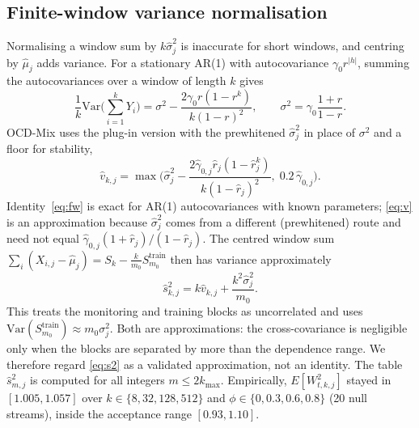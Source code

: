 \documentclass[conference]{IEEEtran}
\newcommand{\hs}{\hat{s}}
\begin{document}
\subsection{Finite-window variance normalisation}
Normalising a window sum by $k\hat\sigma_j^2$ is inaccurate for short windows, and centring by $\hat\mu_j$ adds variance. For a stationary AR(1) with autocovariance $\gamma_0r^{|h|}$, summing the autocovariances over a window of length $k$ gives
\begin{equation}
\frac1k\mathrm{Var}\Big(\sum_{i=1}^kY_i\Big)=\sigma^2-\frac{2\gamma_0r(1-r^k)}{k(1-r)^2},\qquad \sigma^2=\gamma_0\frac{1+r}{1-r}. \label{eq:fw}
\end{equation}
OCD-Mix uses the plug-in version with the prewhitened $\hat\sigma_j^2$ in place of $\sigma^2$ and a floor for stability,
\begin{equation}
\hat v_{k,j}=\max\Big(\hat\sigma_j^2-\frac{2\hat\gamma_{0,j}\hat r_j(1-\hat r_j^k)}{k(1-\hat r_j)^2},\;0.2\,\hat\gamma_{0,j}\Big). \label{eq:v}
\end{equation}
Identity~\eqref{eq:fw} is exact for AR(1) autocovariances with known parameters; \eqref{eq:v} is an approximation because $\hat\sigma^2_j$ comes from a different (prewhitened) route and need not equal $\hat\gamma_{0,j}(1+\hat r_j)/(1-\hat r_j)$. The centred window sum $\sum_i(X_{i,j}-\hat\mu_j)=S_k-\frac{k}{m_0}S^{\mathrm{train}}_{m_0}$ then has variance approximately
\begin{equation}
\hs^2_{k,j}=k\hat v_{k,j}+\frac{k^2\hat\sigma_j^2}{m_0}. \label{eq:s2}
\end{equation}
This treats the monitoring and training blocks as uncorrelated and uses $\mathrm{Var}(S^{\mathrm{train}}_{m_0})\approx m_0\sigma_j^2$. Both are approximations: the cross-covariance is negligible only when the blocks are separated by more than the dependence range. We therefore regard \eqref{eq:s2} as a validated approximation, not an identity. The table $\hs^2_{m,j}$ is computed for all integers $m\le 2k_{\max}$. Empirically, $E[W^2_{t,k,j}]$ stayed in $[1.005,1.057]$ over $k\in\{8,32,128,512\}$ and $\phi\in\{0,0.3,0.6,0.8\}$ (20 null streams), inside the acceptance range $[0.93,1.10]$.
\end{document}
